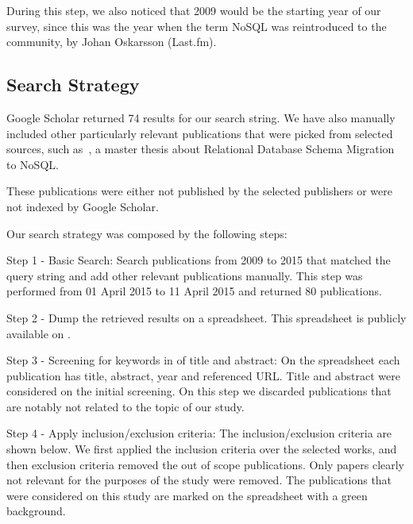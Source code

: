 \documentclass[conference, 10pt, a4paper]{IEEEtran}
\begin{document}
During this step, we also noticed that 2009 would be the starting year of our survey, since this was the year when the term NoSQL was reintroduced to the community, by Johan Oskarsson (Last.fm)\cite{ericevans}.

\subsection{Search Strategy}\label{sec:searchStrategy}

Google Scholar returned 74 results for our search string. We have also manually included other particularly relevant publications that were picked from selected sources, such as~\cite{mastersthesrilinda}, a master thesis about Relational Database Schema Migration to NoSQL.

These publications were either not published by the selected publishers or were not indexed by Google Scholar. 

Our search strategy was composed by the following steps:

Step 1 - Basic Search: Search publications from 2009 to 2015 that matched the query string and add other relevant publications manually. This step was performed from 01 April 2015 to 11 April 2015 and returned 80 publications.

Step 2 - Dump the retrieved results on a spreadsheet. This spreadsheet is publicly available on \cite{systematicMappingSpreadsheet}.

Step 3 - Screening for keywords in of title and abstract: On the spreadsheet each publication has title, abstract, year and referenced URL. Title and abstract were considered on the initial screening. On this step we discarded publications that are notably not related to the topic of our study. %

Step 4 - Apply inclusion/exclusion criteria: The inclusion/exclusion criteria are shown below. We first applied the inclusion criteria over the selected works, and then exclusion criteria removed the out of scope publications. Only papers clearly not relevant for the purposes of the study were removed. The publications that were considered on this study are marked on the spreadsheet with a green background.
\end{document}
